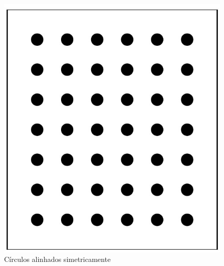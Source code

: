 \begin{figure}[H]
  \includegraphics[width=\linewidth]{Imagens/figura3-5.jpg}
  \caption{Círculos alinhados simetricamente}\label{fig3:5}
\endminipage
\end{figure}


